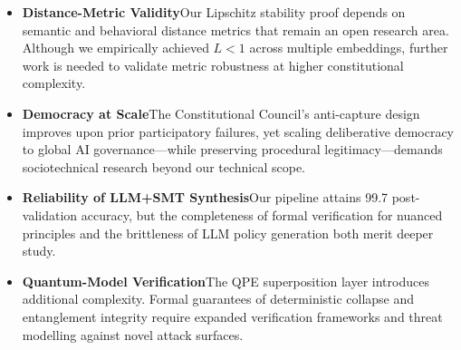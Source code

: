 \begin{itemize}[leftmargin=*, itemsep=2pt]
  \item \textbf{Distance-Metric Validity}\quad Our Lipschitz stability proof depends on semantic and behavioral distance metrics that remain an open research area.  Although we empirically achieved $L<1$ across multiple embeddings, further work is needed to validate metric robustness at higher constitutional complexity.

  \item \textbf{Democracy at Scale}\quad The Constitutional Council’s anti-capture design improves upon prior participatory failures, yet scaling deliberative democracy to global AI governance---while preserving procedural legitimacy---demands sociotechnical research beyond our technical scope.

  \item \textbf{Reliability of LLM+SMT Synthesis}\quad Our pipeline attains 99.7\percent{} post-validation accuracy, but the completeness of formal verification for nuanced principles and the brittleness of LLM policy generation both merit deeper study.

  \item \textbf{Quantum-Model Verification}\quad The QPE superposition layer introduces additional complexity.  Formal guarantees of deterministic collapse and entanglement integrity require expanded verification frameworks and threat modelling against novel attack surfaces.
\end{itemize}
